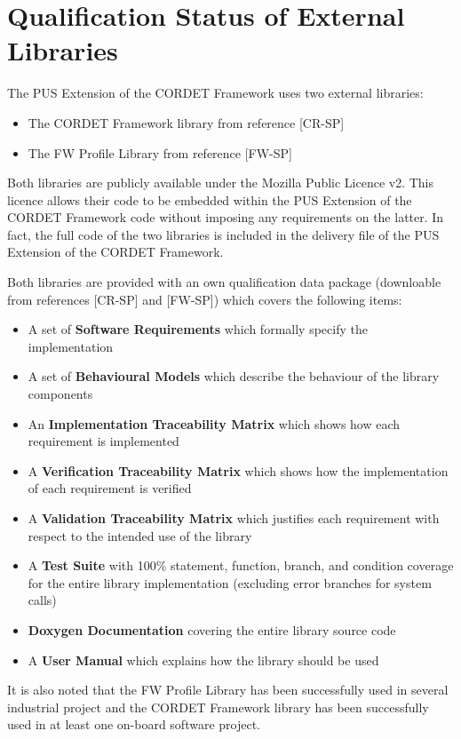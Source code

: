 \documentclass{pnp_article}
\begin{document}
\section{Qualification Status of External Libraries}\label{sec:svrExtLib}
The PUS Extension of the CORDET Framework uses two external libraries:

\begin{itemize}
\item The CORDET Framework library from reference [CR-SP]
\item The FW Profile Library from reference [FW-SP]
\end{itemize}

Both libraries are publicly available under the Mozilla Public Licence v2. This licence allows their code to be embedded within the PUS Extension of the CORDET Framework code without imposing any requirements on the latter. In fact, the full code of the two libraries is included in the delivery file of the PUS Extension of the CORDET Framework.

Both libraries are provided with an own qualification data package (downloable from references [CR-SP] and [FW-SP]) which covers the following items:

\begin{itemize}
\item A set of \textbf{Software Requirements} which formally specify the implementation
\item A set of \textbf{Behavioural Models} which describe the behaviour of the library components
\item An \textbf{Implementation Traceability Matrix} which shows how each requirement is implemented
\item A \textbf{Verification Traceability Matrix} which shows how the implementation of each requirement is verified
\item A \textbf{Validation Traceability Matrix} which justifies each requirement with respect to the intended use of the library
\item A \textbf{Test Suite} with 100\% statement, function, branch, and condition coverage for the entire library implementation (excluding error branches for system calls)
\item \textbf{Doxygen Documentation} covering the entire library source code
\item A \textbf{User Manual} which explains how the library should be used
\end{itemize}

It is also noted that the FW Profile Library has been successfully used in several industrial project and the CORDET Framework library has been successfully used in at least one on-board software project.
\end{document}
